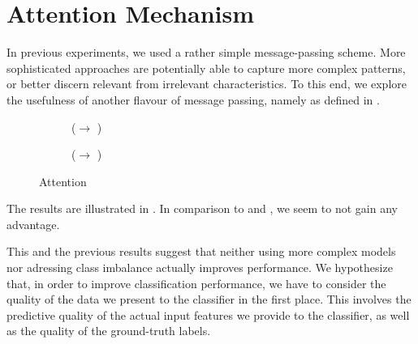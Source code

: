 \documentclass[
	fontsize=10pt, %
	twoside=false, %
	secnumdepth=1, %
  toc=indentunnumbered %
]{kaobook}
\begin{document}





\section{Attention Mechanism}

In previous experiments, we used a rather simple message-passing scheme. More
sophisticated approaches are potentially able to capture more complex patterns,
or better discern relevant from irrelevant characteristics. To this end, we
explore the usefulness of another flavour of message passing, namely  as defined in .




\begin{figure}[h]
\centering
\begin{subfigure}[h]{0.48\linewidth}
  \caption{(\ADLast $\rightarrow$ \PDMap)}
\end{subfigure}
\begin{subfigure}[h]{0.48\linewidth}
  \caption{(\ADLast $\rightarrow$ \ReconMap)}
\end{subfigure}
\caption{Attention}
\label{fig:results-attention}
\end{figure}

The results are illustrated in . In comparison to
 and
, we seem to not gain any advantage.

This and the previous results suggest that neither using more complex models nor
adressing class imbalance actually improves performance. We hypothesize that, in
order to improve classification performance, we have to consider the quality of
the data we present to the classifier in the first place. This involves the
predictive quality of the actual input features we provide to the classifier, as
well as the quality of the ground-truth labels.
\end{document}
